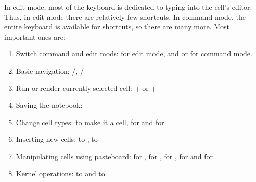 \documentclass[letterpaper,10pt,english]{sphinxmanual}
\begin{document}
In edit mode, most of the keyboard is dedicated to typing into the cell’s editor. Thus, in edit mode there are relatively few shortcuts. In command mode, the entire keyboard is available for shortcuts, so there are many more. Most important ones are:
\begin{enumerate}
%
\item {} 
Switch command and edit mods:  for edit mode, and  or  for command mode.

\item {} 
Basic navigation: /, /

\item {} 
Run or render currently selected cell: + or +

\item {} 
Saving the notebook: 

\item {} 
Change cell types:  to make it a  cell,  for  and  for 

\item {} 
Inserting new cells:  to ,  to 

\item {} 
Manipulating cells using pasteboard:  for ,  for ,  for ,  for  and  for 

\item {} 
Kernel operations:  to  and  to 

\end{enumerate}
\end{document}
